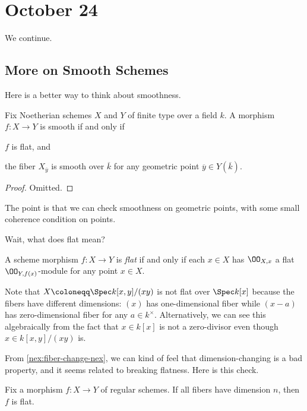 \documentclass[../notes.tex]{subfiles}
\begin{document}
\section{October 24}

We continue.

\subsection{More on Smooth Schemes}
Here is a better way to think about smoothness.
\begin{proposition}
	Fix Noetherian schemes $X$ and $Y$ of finite type over a field $k$. A morphism $f\colon X\to Y$ is smooth if and only if
	\begin{listroman}
		\item $f$ is flat, and
		\item the fiber $X_{\overline y}$ is smooth over $\overline k$ for any geometric point $\overline y\in Y(\overline k)$.
	\end{listroman}
\end{proposition}
\begin{proof}
	Omitted.
\end{proof}
\begin{remark}
	The point is that we can check smoothness on geometric points, with some small coherence condition on points.
\end{remark}
Wait, what does flat mean?
\begin{definition}[Flat]
	A scheme morphism $f\colon X\to Y$ is \textit{flat} if and only if each $x\in X$ has $\OO_{X,x}$ a flat $\OO_{Y,f(x)}$-module for any point $x\in X$.
\end{definition}
\begin{nex} \label{nex:fiber-change-nex}
	Note that $X\coloneqq\Spec k[x,y]/(xy)$ is not flat over $\Spec k[x]$ because the fibers have different dimensions: $(x)$ has one-dimensional fiber while $(x-a)$ has zero-dimensional fiber for any $a\in k^\times$. Alternatively, we can see this algebraically from the fact that $x\in k[x]$ is not a zero-divisor even though $x\in k[x,y]/(xy)$ is.
\end{nex}
From \autoref{nex:fiber-change-nex}, we can kind of feel that dimension-changing is a bad property, and it seems related to breaking flatness. Here is this check.
\begin{theorem}
	Fix a morphism $f\colon X\to Y$ of regular schemes. If all fibers have dimension $n$, then $f$ is flat.
\end{theorem}
\end{document}
